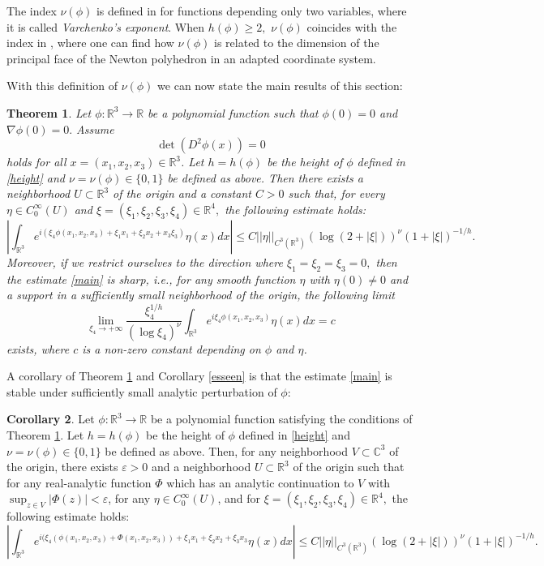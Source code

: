 \documentclass[a4paper, 11pt]{article}
\theoremstyle{plain}
\newtheorem{theorem}{Theorem}[section]
\theoremstyle{definition}
\theoremstyle{lemma}
\theoremstyle{Remark}
\theoremstyle{proposition}
\theoremstyle{corollary}
\newtheorem{corollary}[theorem]{Corollary}
\theoremstyle{example}
\theoremstyle{assumption}
\begin{document}
 The index $\nu(\phi)$ is defined in \cite{Ik.Mu} for functions depending only two variables, where it is called \emph{Varchenko's exponent}. When $h(\phi)\geq 2,$ $\nu(\phi)$ coincides with the index in \cite[Theorem 0.4]{Var}, where one can find how $\nu(\phi)$ is related to the dimension of the principal face of the Newton polyhedron in an adapted coordinate system.


 With this definition of $\nu(\phi)$ we can now state the main results of this section:
\begin{theorem}\label{th:osc}
Let  $\phi:\mathbb{R}^3\to \mathbb{R}$ be a  polynomial function such that $\phi(0)=0$ and $\nabla \phi(0)=0.$  Assume $$\det{(D^2\phi(x))}=0$$
holds  for all $x=(x_1,x_2,x_3)\in \mathbb{R}^3$. Let $h=h(\phi)$ be the height of $\phi$ defined in \eqref{height} and $\nu=\nu(\phi)\in \{0,1\}$ be defined as above.  Then there exists a neighborhood $U\subset \mathbb{R}^3$ of the origin and a constant $C>0$ such that, for every $ \eta \in C^{\infty}_0(U)$ and $\xi=(\xi_1,\xi_2,\xi_3,\xi_4)\in \mathbb{R}^4,$ the following estimate holds:
\begin{equation}\label{main}
\left|\int_{\mathbb{R}^3}e^{i(\xi_4\phi(x_1,x_2,x_3)+\xi_1x_1+\xi_2x_2+x_3\xi_3)} \eta(x)dx\right|\leq C||\eta||_{C^3(\mathbb{R}^3)}(\log(2+|\xi|))^{\nu}(1+|\xi|)^{-1/h}.
\end{equation}
Moreover, if we restrict ourselves to the direction where $\xi_1=\xi_2=\xi_3=0,$  then the estimate  \eqref{main} is sharp, i.e., for any smooth function $ \eta $ with  $\eta(0)\neq 0$ and a  support in a sufficiently small neighborhood of the origin, the following limit
  \begin{equation}\label{sharp}
  \lim_{\xi_4\to +\infty}\frac{\xi_4^{1/h}}{(\log{\xi_4})^{\nu}}\int_{\mathbb{R}^3}e^{i\xi_4\phi
  (x_1,x_2,x_3)} \eta(x)dx=c
  \end{equation}
  exists, where $c$ is a non-zero constant depending on $\phi$ and $\eta$.
\end{theorem}
A corollary of Theorem \ref{th:osc} and Corollary \ref{esseen} is that the estimate \eqref{main} is stable under sufficiently small analytic perturbation of $\phi$:
\begin{corollary}\label{cor:Karp}
Let  $\phi:\mathbb{R}^3\to \mathbb{R}$ be a  polynomial function satisfying the conditions of Theorem \ref{th:osc}. Let $h=h(\phi)$ be the height of $\phi$ defined in \eqref{height} and $\nu=\nu(\phi)\in \{0,1\}$ be defined as above. Then, for any neighborhood $V \subset \mathbb{C}^3$ of the origin, there exists  $\varepsilon > 0$ and a neighborhood $U \subset \mathbb{R}^3$ of the origin such that for any real-analytic function $\Phi$ which has an analytic continuation to $V$ with $\sup_{z \in V} |\Phi(z)| < \varepsilon$, for any $\eta \in C_0^\infty(U)$, and for $\xi=(\xi_1,\xi_2,\xi_3,\xi_4)\in \mathbb{R}^4,$  the following estimate holds:
\begin{equation}\label{finalb}
\left|\int_{\mathbb{R}^3}e^{i (\xi_4(\phi(x_1, x_2, x_3)+\Phi(x_1, x_2, x_3))+\xi_1x_1+\xi_2x_2+\xi_3x_3} \eta(x)dx\right|\leq C||\eta||_{C^3(\mathbb{R}^3)}(\log(2+|\xi|))^{\nu}(1+|\xi|)^{-1/h}.
\end{equation}
\end{corollary}
\end{document}
